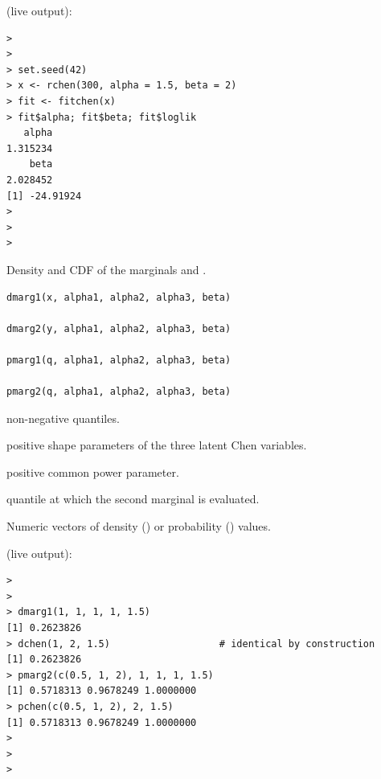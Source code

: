 \documentclass[11pt,a4paper]{article}
\begin{document}
\vspace{0.8em}
 (live output):
\begin{lstlisting}
> 
> 
> set.seed(42)
> x <- rchen(300, alpha = 1.5, beta = 2)
> fit <- fitchen(x)
> fit$alpha; fit$beta; fit$loglik
   alpha 
1.315234 
    beta 
2.028452 
[1] -24.91924
> 
> 
> 
\end{lstlisting}


\newpage

%
\begin{Description}
Density and CDF of the marginals
 and
.
\end{Description}
%
\begin{Usage}
\begin{verbatim}
dmarg1(x, alpha1, alpha2, alpha3, beta)

dmarg2(y, alpha1, alpha2, alpha3, beta)

pmarg1(q, alpha1, alpha2, alpha3, beta)

pmarg2(q, alpha1, alpha2, alpha3, beta)
\end{verbatim}
\end{Usage}
%
\begin{Arguments}
\begin{ldescription}
\item[\code{x}, \code{q}] non-negative quantiles.

\item[\code{alpha1}, \code{alpha2}, \code{alpha3}] positive shape parameters of the three
latent Chen variables.

\item[\code{beta}] positive common power parameter.

\item[\code{y}] quantile at which the second marginal is evaluated.
\end{ldescription}
\end{Arguments}
%
\begin{Value}
Numeric vectors of density () or probability
() values.
\end{Value}
%


\vspace{0.8em}
 (live output):
\begin{lstlisting}
> 
> 
> dmarg1(1, 1, 1, 1, 1.5)
[1] 0.2623826
> dchen(1, 2, 1.5)                   # identical by construction
[1] 0.2623826
> pmarg2(c(0.5, 1, 2), 1, 1, 1, 1.5)
[1] 0.5718313 0.9678249 1.0000000
> pchen(c(0.5, 1, 2), 2, 1.5)
[1] 0.5718313 0.9678249 1.0000000
> 
> 
> 
\end{lstlisting}
\end{document}
